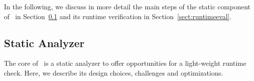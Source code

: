 In the following, we discuss in more detail the main steps of the static component of \tool\ in Section~\ref{sect:staticanalysis}
and its runtime verification in Section~\ref{sect:runtimeeval}.
\fi

% 

\subsection{Static Analyzer}
\label{sect:staticanalysis}
The core of \tool\ is a static analyzer to
offer opportunities for a light-weight runtime
check. Here, we describe its design choices, 
challenges and optimizations.

